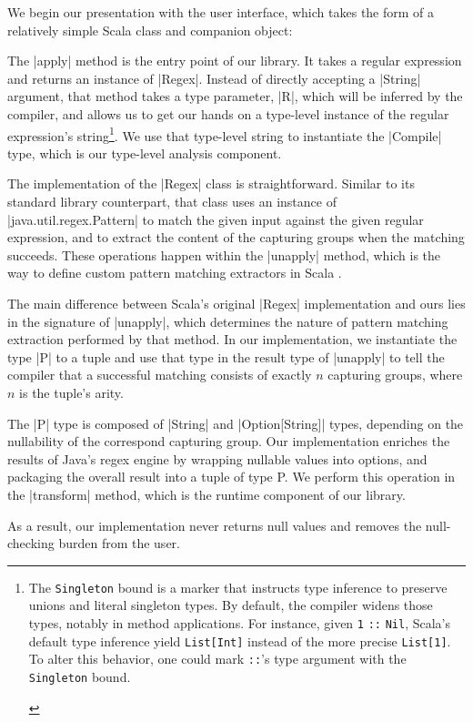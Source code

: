 We begin our presentation with the user interface, which takes the form of a relatively simple Scala class and companion object:

\regexUserLevel

The |apply| method is the entry point of our library.
It takes a regular expression and returns an instance of |Regex|.
Instead of directly accepting a |String| argument, that method takes a type parameter, |R|, which will be inferred by the compiler, and allows us to get our hands on a type-level instance of the regular expression's string\footnote{
\begin{diff}
The \texttt{Singleton} bound is a marker that instructs type inference to preserve unions and literal singleton types.
By default, the compiler widens those types, notably in method applications.
For instance, given \texttt{1} \texttt{::} \texttt{Nil}, Scala's default type inference yield \texttt{List[Int]} instead of the more precise \texttt{List[1]}.
To alter this behavior, one could mark \texttt{::}'s type argument with the \texttt{Singleton} bound.
\end{diff}
}.
We use that type-level string to instantiate the |Compile| type, which is our type-level analysis component.

The implementation of the |Regex| class is straightforward.
Similar to its standard library counterpart, that class uses an instance of |java.util.regex.Pattern| to match the given input against the given regular expression, and to extract the content of the capturing groups when the matching succeeds.
These operations happen within the |unapply| method, which is the way to define custom pattern matching extractors in Scala \citep{emir2007matching}.

The main difference between Scala's original |Regex| implementation and ours lies in the signature of |unapply|, which determines the nature of pattern matching extraction performed by that method.
In our implementation, we instantiate the type |P| to a tuple and use that type in the result type of |unapply| to tell the compiler that a successful matching consists of exactly $n$ capturing groups, where $n$ is the tuple's arity.
\begin{diff}
The |P| type is composed of |String| and |Option[String]| types, depending on the nullability of the correspond capturing group.
Our implementation enriches the results of Java's regex engine by wrapping nullable values into options, and packaging the overall result into a tuple of type P.
We perform this operation in the |transform| method, which is the runtime component of our library.
\end{diff}
As a result, our implementation never returns null values and removes the null-checking burden from the user.

